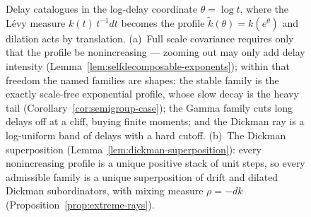 \begin{figure}[t]
\caption{Delay catalogues in the log-delay coordinate $\theta = \log t$, where the
Lévy measure $k(t)\,t^{-1}dt$ becomes the profile $\tilde k(\theta) = k(e^\theta)$
and dilation acts by translation. (a)~Full scale covariance requires only that the
profile be nonincreasing --- zooming out may only add delay intensity
(Lemma~\ref{lem:selfdecomposable-exponents}); within that freedom the named families
are shapes: the stable family is the exactly scale-free exponential profile, whose
slow decay is the heavy tail (Corollary~\ref{cor:semigroup-case}); the Gamma family
cuts long delays off at a cliff, buying finite moments; and the Dickman ray is a
log-uniform band of delays with a hard cutoff. (b)~The Dickman superposition
(Lemma~\ref{lem:dickman-superposition}): every nonincreasing profile is a unique
positive stack of unit steps, so every admissible family is a unique superposition of
drift and dilated Dickman subordinators, with mixing measure $\rho = -dk$
(Proposition~\ref{prop:extreme-rays}).}
\label{fig:delay-catalogue}
\end{figure}
